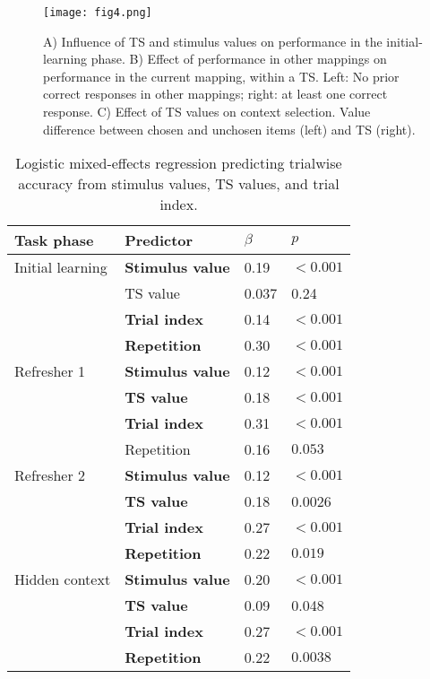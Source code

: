 \documentclass[10pt, letterpaper]{article}
\begin{document}
\begin{figure}[ht]
\begin{center}
\texttt{[image: fig4.png]}
\end{center}
\caption{
    A) Influence of TS and stimulus values on performance in the initial-learning phase.
    B) Effect of performance in other mappings on performance in the current mapping, within a TS. Left: No prior correct responses in other mappings; right: at least one correct response.
    C) Effect of TS values on context selection. Value difference between chosen and unchosen items (left) and TS (right).}
\label{figure:learning values}
\end{figure}

\begin{table}[!ht]
\begin{center} 
\caption{Logistic mixed-effects regression predicting trialwise accuracy from stimulus values, TS values, and trial index.} 
\label{table:accuracy} 
\vskip 0.1in
\small{
\begin{tabular}{llll} 
\hline
Task phase          &   Predictor               &   $\beta$ &   $p$ \\
\hline
Initial learning    &   {\bf Stimulus value}    &   0.19    &   $<0.001$ \\
                    &   TS value                &   0.037   &   0.24     \\
                    &   {\bf Trial index}       &   0.14    &   $<0.001$ \\
                    &   {\bf Repetition}        &   0.30    &   $<0.001$ \\
Refresher 1         &   {\bf Stimulus value}    &   0.12    &   $<0.001$ \\
                    &   {\bf TS value}          &   0.18    &   $<0.001$ \\
                    &   {\bf Trial index}       &   0.31    &   $<0.001$ \\
                    &   Repetition              &   0.16    &   $0.053$  \\
Refresher 2         &   {\bf Stimulus value}    &   0.12    &   $<0.001$ \\
                    &   {\bf TS value}          &   0.18    &   0.0026   \\
                    &   {\bf Trial index}       &   0.27    &   $<0.001$ \\
                    &   {\bf Repetition}        &   0.22    &   $0.019$  \\
Hidden context      &   {\bf Stimulus value}    &   0.20    &   $<0.001$ \\
                    &   {\bf TS value}          &   0.09    &   0.048    \\
                    &   {\bf Trial index}       &   0.27    &   $<0.001$ \\
                    &   {\bf Repetition}        &   0.22    &   $0.0038$ \\
\hline
\end{tabular}
}
\end{center} 
\end{table}
\end{document}

